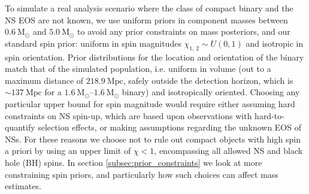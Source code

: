 To simulate a real analysis scenario where the class of compact binary and the NS EOS are not known, we use uniform priors in component masses between $0.6~\mathrm{M}_\odot$ and $5.0~\mathrm{M}_\odot$ to avoid any prior constraints on mass posteriors, and our standard spin prior: uniform in spin magnitudes $\chi_{1,\,2} \sim U(0, 1)$ and isotropic in spin orientation. Prior distributions for the location and orientation of the binary match that of the simulated population, i.e. uniform in volume (out to a maximum distance of $218.9~\mathrm{Mpc}$, safely outside the detection horizon, which is $\sim137~\mathrm{Mpc}$ for a $1.6~\mathrm{M}_\odot$--$1.6~\mathrm{M}_\odot$ binary) and isotropically oriented.  Choosing any particular upper bound for spin magnitude would require either assuming hard constraints on NS spin-up, which are based upon observations with hard-to-quantify selection effects, or making assumptions regarding the unknown EOS of NSs. For these reasons we choose not to rule out compact objects with high spin a priori by using an upper limit of $\chi < 1$, encompassing all allowed NS and black hole (BH) spins.  In section \ref{subsec:prior_constraints} we look at more constraining spin priors, and particularly how such choices can affect mass estimates.
  
  
  
  
  
  
  
  
  
  
  
  